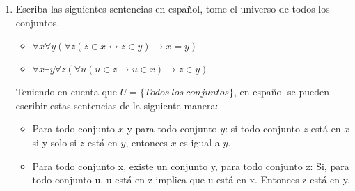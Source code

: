 \begin{enumerate}
\begin{solucion}
\begin{itemize}
        ~\newline
        Si leen con cuidado, la prueba se puede llevar de abajo hacia arriba con algunos detalles menores.

        \item No es equivalencia lógica, tome el universo como los números naturales, p(x) := x es par y q(x) := x es impar. Si bien es cierto que para todo x, x es par o impar, no es cierto que de aquí se pueda concluir que para todo x, x es par o que para todo x, x es impar.
        \item No es equivalencia lógica, tome el universo de los números naturales, p(x) := x es par y q(x) := x es impar. Es cierto que existe un número natural que es par, por ejemplo 2, y es cierto que existe un número natural impar, por ejemplo 3. Pero de esto no se puede concluir que exista un número natural que sea par e impar al tiempo.
        \item Es equivalencia lógica, la demostración queda pendiente.

    \end{itemize}

    \end{solucion}


    \item Escriba las siguientes sentencias en español, tome el universo de todos los conjuntos.

    \begin{multicols}{2}
    \begin{itemize}
        \item $\forall x \forall y (\forall z ( z \in x \leftrightarrow z \in y ) \rightarrow x = y )$
    \end{itemize}
    \columnbreak
    \begin{itemize}
        \item $\forall x \exists y \forall z (\forall u (u \in z \rightarrow u \in x ) \rightarrow z \in y ) $
    \end{itemize}
    \end{multicols}

    \begin{solucion}

    Teniendo en cuenta que $U = \{Todos\ los\ conjuntos\}$, en español se pueden escribir estas sentencias de la siguiente manera:

    \begin{itemize}
        \item Para todo conjunto $x$ y para todo conjunto $y$: si todo conjunto $z$ está en $x$ si y solo si $z$ está en $y$, entonces $x$ es igual a $y$.
        \item Para todo conjunto x, existe un conjunto y, para todo conjunto z: Si, para todo conjunto u, u está en z implica que u está en x. Entonces z está en y.
    \end{itemize}


\end{solucion}
\end{enumerate}
